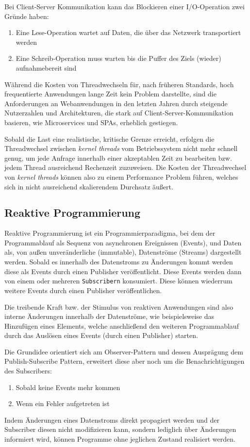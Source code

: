 \noindent
Bei Client-Server Kommunikation kann das Blockieren einer I/O-Operation zwei Gründe haben:
\begin{enumerate}
	\item Eine Lese-Operation wartet auf Daten, die über das Netzwerk transportiert werden
	\item Eine Schreib-Operation muss warten bis die Puffer des Ziels (wieder) aufnahmebereit sind
\end{enumerate}

\noindent
Während die Kosten von Threadwechseln für, nach früheren Standards, hoch frequentierte Anwendungen lange Zeit kein Problem darstellte,
sind die Anforderungen an Webanwendungen in den letzten Jahren durch steigende Nutzerzahlen und Architekturen,
die stark auf Client-Server-Kommunikation basieren, wie Microservices und SPAs, erheblich gestiegen.

\noindent
Sobald die Last eine realistische, kritische Grenze erreicht, erfolgen die Threadwechsel zwischen \textit{kernel threads} vom Betriebssystem
nicht mehr schnell genug, um jede Anfrage innerhalb einer akzeptablen Zeit zu bearbeiten bzw. jedem Thread ausreichend Rechenzeit zuzuweisen.
Die Kosten der Threadwechsel von \textit{kernel threads} können also zu einem Performance Problem führen, welches sich in nicht
ausreichend skalierendem Durchsatz äußert.

\subsection{Reaktive Programmierung}
\label{section:reaktive_programmierung}
Reaktive Programmierung ist ein Programmierparadigma, bei dem der Programmablauf als Sequenz von asynchronen Ereignissen (Events), und
Daten als, von außen unveränderliche (immutable), Datenströme (Streams) dargestellt werden.
Sobald es innerhalb des Datenstroms zu Änderungen kommt werden diese als Events durch einen Publisher veröffentlicht.
Diese Events werden dann von einem oder mehreren \verb|Subscribern| konsumiert. Diese können wiederrum weitere Events durch einen Publisher veröffentlichen.

Die treibende Kraft bzw. der Stimulus von reaktiven Anwendungen sind also interne Änderungen innerhalb der Datenströme, wie beispielsweise das
Hinzufügen eines Elements, welche anschließend den weiteren Programmablauf durch das Auslösen eines Events (durch einen Publisher) starten.

Die Grundidee orientiert sich am Observer-Pattern und dessen Ausprägung dem Publish-Subscribe Pattern, erweitert diese aber
noch um die Benachrichtigungen des Subscribers:
\begin{enumerate}
	\item Sobald keine Events mehr kommen
	\item Wenn ein Fehler aufgetreten ist
\end{enumerate}
Indem Änderungen eines Datenstroms direkt propagiert werden und der Subscriber diesen nicht modifizieren kann, sondern lediglich über Änderungen informiert wird,
können Programme ohne jeglichen Zustand realisiert werden\parencite{Escoffier2017}.


